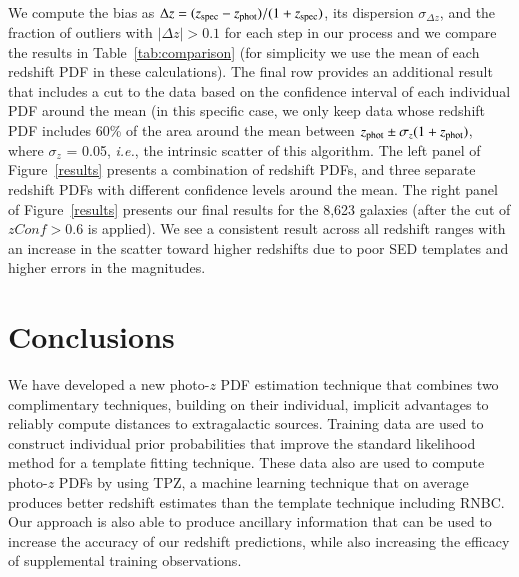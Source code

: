 \documentclass[11pt,twoside]{article}
\begin{document}
We  compute the bias as $\Delta z = (z_{\rm spec}-z_{\rm phot})/(1+z_{\rm spec})$, its dispersion $\sigma_{\Delta z}$, and the fraction of outliers with $|\Delta z| > 0.1$ for each step in our process and we compare the results in Table~\ref{tab:comparison} (for simplicity we use the mean of each redshift PDF in these calculations). The final row provides an additional result that includes a cut to the data based on the confidence interval of each individual PDF around the mean (in this specific case, we only keep data whose redshift PDF includes 60\% of the area around the mean between $z_{\rm phot} \pm \sigma_{z}(1+z_{\rm phot})$, where $\sigma_z$ = 0.05, \textit{i.e.}, the intrinsic scatter of this algorithm. The left panel of Figure~\ref{results} presents a combination of redshift PDFs, and three separate redshift PDFs with different confidence levels around the mean. The right panel of Figure~\ref{results} presents our final results for the 8,623 galaxies (after the cut of $zConf > 0.6$ is applied). We see a consistent result across all redshift ranges with an increase in the scatter toward higher redshifts due to poor SED templates and higher errors in the magnitudes. 


\section{Conclusions}
We have developed a new photo-$z$ PDF estimation technique that combines two complimentary techniques, building on their individual, implicit advantages to reliably compute distances to extragalactic sources. Training data are used to construct individual prior probabilities that improve the standard likelihood method for a template fitting technique. These data also are used to compute photo-$z$ PDFs by using TPZ, a machine learning technique that on average produces better redshift estimates than the template technique including RNBC. Our approach is also able to produce ancillary information that can be used to increase the accuracy of our redshift predictions, while also increasing the efficacy of supplemental training observations.


\end{document}

